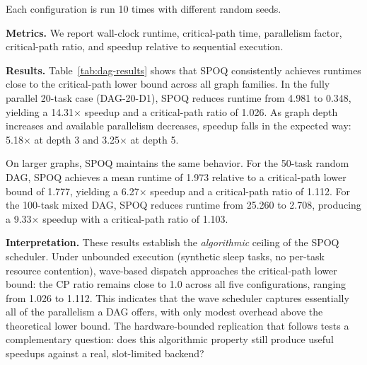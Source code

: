 Each configuration is run 10 times with different random seeds.

\textbf{Metrics.}
We report wall-clock runtime, critical-path time, parallelism factor, critical-path ratio, and speedup relative to sequential execution.

\begin{table}[!htbp]
\centering
\caption{Experiment 1 results (means across 10 runs).}
\label{tab:dag-results}
\end{table}

\textbf{Results.}
Table~\ref{tab:dag-results} shows that SPOQ consistently achieves runtimes close to the critical-path lower bound across all graph families. In the fully parallel 20-task case (DAG-20-D1), SPOQ reduces runtime from 4.981 to 0.348, yielding a 14.31$\times$ speedup and a critical-path ratio of 1.026. As graph depth increases and available parallelism decreases, speedup falls in the expected way: 5.18$\times$ at depth 3 and 3.25$\times$ at depth 5.

On larger graphs, SPOQ maintains the same behavior. For the 50-task random DAG, SPOQ achieves a mean runtime of 1.973 relative to a critical-path lower bound of 1.777, yielding a 6.27$\times$ speedup and a critical-path ratio of 1.112. For the 100-task mixed DAG, SPOQ reduces runtime from 25.260 to 2.708, producing a 9.33$\times$ speedup with a critical-path ratio of 1.103.

\textbf{Interpretation.}
These results establish the \emph{algorithmic} ceiling of the SPOQ scheduler. Under unbounded execution (synthetic sleep tasks, no per-task resource contention), wave-based dispatch approaches the critical-path lower bound: the CP ratio remains close to 1.0 across all five configurations, ranging from 1.026 to 1.112. This indicates that the wave scheduler captures essentially all of the parallelism a DAG offers, with only modest overhead above the theoretical lower bound. The hardware-bounded replication that follows tests a complementary question: does this algorithmic property still produce useful speedups against a real, slot-limited backend?

